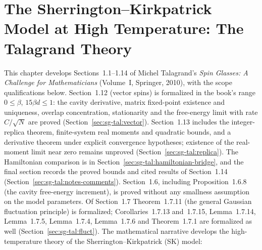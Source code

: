 \chapter{The Sherrington--Kirkpatrick Model at High Temperature: The Talagrand Theory}\label{chap:sg-talagrand}

This chapter develops Sections~1.1--1.14 of Michel Talagrand's \emph{Spin Glasses: A Challenge for Mathematicians} (Volume~I, Springer, 2010), with the scope qualifications below. Section~1.12 (vector spins) is formalized in the book's range $0\le\beta$, $15\beta d\le1$: the cavity derivative, matrix fixed-point existence and uniqueness, overlap concentration, stationarity and the free-energy limit with rate $C/\sqrt N$ are proved (Section~\ref{sec:sg-tal:vector}). Section~1.13 includes the integer-replica theorem, finite-system real moments and quadratic bounds, and a derivative theorem under explicit convergence hypotheses; existence of the real-moment limit near zero remains unproved (Section~\ref{sec:sg-tal:replica}). The Hamiltonian comparison is in Section~\ref{sec:sg-tal:hamiltonian-bridge}, and the final section records the proved bounds and cited results of Section~1.14 (Section~\ref{sec:sg-tal:notes-comments}).
Section~1.6, including Proposition~1.6.8 (the cavity free-energy increment), is proved without any smallness assumption on the model parameters.
Of Section~1.7 Theorem~1.7.11 (the general Gaussian fluctuation principle) is formalized; Corollaries~1.7.13 and~1.7.15, Lemma~1.7.14, Lemma~1.7.5, Lemma~1.7.4, Lemma~1.7.6 and Theorem~1.7.1 are formalized as well (Section~\ref{sec:sg-tal:fluct}).
The mathematical narrative develops the high-temperature theory of the Sherrington--Kirkpatrick (SK) model:
